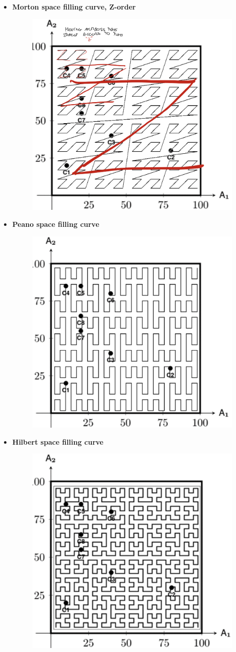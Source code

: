 \begin{itemize}
    
    \item \textbf{Morton space filling curve, Z-order}
    \begin{figure}[h]
         \centering
         \includegraphics[width=.4\linewidth]{images/DBMS_Internals/MultiDimensionalDataOrganizations/z_order.jpeg}
    \end{figure}

    
    \item \textbf{Peano space filling curve}
    \begin{figure}[h]
         \centering
         \includegraphics[width=.4\linewidth]{images/DBMS_Internals/MultiDimensionalDataOrganizations/peano.jpeg}
    \end{figure}

    
    \item \textbf{Hilbert space filling curve}
    \begin{figure}[h]
         \centering
         \includegraphics[width=.4\linewidth]{images/DBMS_Internals/MultiDimensionalDataOrganizations/hilbert.jpeg}
    \end{figure}

    
\end{itemize}

